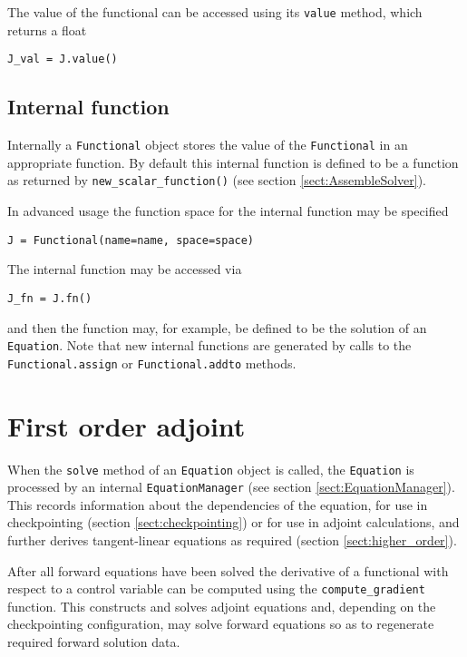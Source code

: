 \documentclass[11pt]{article}
\begin{document}
The value of the functional can be accessed using its \texttt{value} method,
which returns a float
\begin{lstlisting}
J_val = J.value()
\end{lstlisting}

\subsection{Internal function}\label{sect:Functional_internals}

Internally a \texttt{Functional} object stores the value of the
\texttt{Functional} in an appropriate function. By default this internal
function is defined to be a function as returned by
\texttt{new\_scalar\_function()} (see section \ref{sect:AssembleSolver}).

In advanced usage the function space for the internal function may be specified
\begin{lstlisting}
J = Functional(name=name, space=space)
\end{lstlisting}
The internal function may be accessed via
\begin{lstlisting}
J_fn = J.fn()
\end{lstlisting}
and then the function may, for example, be defined to be the solution of an
\texttt{Equation}. Note that new internal functions are generated by calls to
the \texttt{Functional.assign} or \texttt{Functional.addto} methods.

\section{First order adjoint}\label{sect:first_order_adjoint}

When the \texttt{solve} method of an \texttt{Equation} object is called, the
\texttt{Equation} is processed by an internal \texttt{EquationManager} (see
section \ref{sect:EquationManager}). This records information about the
dependencies of the equation, for use in checkpointing (section
\ref{sect:checkpointing}) or for use in adjoint calculations, and further
derives tangent-linear equations as required (section \ref{sect:higher_order}).

After all forward equations have been solved the derivative of a functional
with respect to a control variable can be computed using the
\texttt{compute\_gradient} function. This constructs and solves adjoint
equations and, depending on the checkpointing configuration, may solve forward
equations so as to regenerate required forward solution data.
\end{document}
